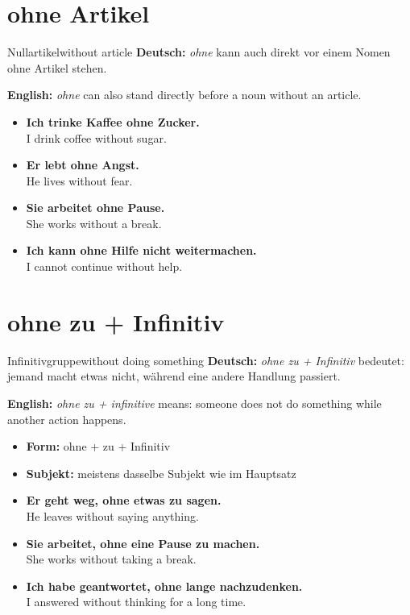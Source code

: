 \documentclass[a4paper,11pt]{article}
\newcommand{\GermanText}[1]{\textbf{Deutsch: }#1\par}
\newcommand{\EnglishText}[1]{{\small\color{SoftGray}\textbf{English: }#1\par}}
\newcommand{\ExampleItem}[2]{\item \textbf{#1}\\{\small\color{SoftGray}#2}}
\begin{document}
\section{ohne Artikel}

\begin{grammarentry}{Nullartikel}{without article}
\GermanText{\textit{ohne} kann auch direkt vor einem Nomen ohne Artikel stehen.}
\EnglishText{\textit{ohne} can also stand directly before a noun without an article.}

\begin{exbox}
\begin{itemize}
    \ExampleItem{Ich trinke Kaffee ohne Zucker.}{I drink coffee without sugar.}
    \ExampleItem{Er lebt ohne Angst.}{He lives without fear.}
    \ExampleItem{Sie arbeitet ohne Pause.}{She works without a break.}
    \ExampleItem{Ich kann ohne Hilfe nicht weitermachen.}{I cannot continue without help.}
\end{itemize}
\end{exbox}
\end{grammarentry}

\section{ohne zu + Infinitiv}

\begin{grammarentry}{Infinitivgruppe}{without doing something}
\GermanText{\textit{ohne zu + Infinitiv} bedeutet: jemand macht etwas nicht, während eine andere Handlung passiert.}
\EnglishText{\textit{ohne zu + infinitive} means: someone does not do something while another action happens.}

\begin{itemize}
    \item \textbf{Form:} ohne + zu + Infinitiv
    \item \textbf{Subjekt:} meistens dasselbe Subjekt wie im Hauptsatz
\end{itemize}

\begin{exbox}
\begin{itemize}
    \ExampleItem{Er geht weg, ohne etwas zu sagen.}{He leaves without saying anything.}
    \ExampleItem{Sie arbeitet, ohne eine Pause zu machen.}{She works without taking a break.}
    \ExampleItem{Ich habe geantwortet, ohne lange nachzudenken.}{I answered without thinking for a long time.}
\end{itemize}
\end{exbox}
\end{grammarentry}
\end{document}
